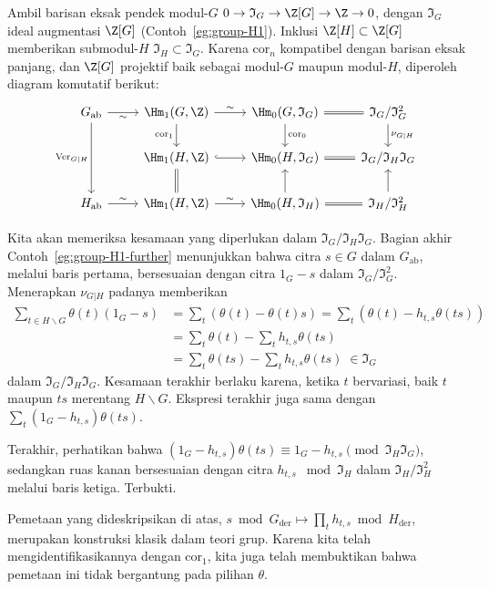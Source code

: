 \begin{bukti}
	Ambil barisan eksak pendek modul-$G$
	$0\to\mathfrak{I}_G\to\Z[G]\to\Z\to0$, dengan $\mathfrak{I}_G$ ideal
	augmentasi $\Z[G]$ (Contoh~\ref{eg:group-H1}). Inklusi
	$\Z[H]\subset\Z[G]$ memberikan submodul-$H$
	$\mathfrak{I}_H\subset\mathfrak{I}_G$. Karena $\mathrm{cor}_n$
	kompatibel dengan barisan eksak panjang, dan $\Z[G]$ projektif baik sebagai
	modul-$G$ maupun modul-$H$, diperoleh diagram komutatif berikut:
	\[\begin{tikzcd}
		G_{\mathrm{ab}} \arrow[r, "\sim"'] \arrow[dd, "{\mathrm{Ver}_{G|H}}"'] &
		\Hm_1(G, \Z) \arrow[d, "{\mathrm{cor}_1}"'] \arrow[r, "\sim"] & \Hm_0(G, \mathfrak{I}_G) \arrow[d, "{\mathrm{cor}_0}"] \arrow[equal, r] &  \mathfrak{I}_G/\mathfrak{I}_G^2 \arrow[d, "{\nu_{G|H}}"] \\
		& \Hm_1(H, \Z) \arrow[equal, d] \arrow[hookrightarrow, r] & \Hm_0(H, \mathfrak{I}_G) \arrow[equal, r] & \mathfrak{I}_G / \mathfrak{I}_H \mathfrak{I}_G \\
		H_{\mathrm{ab}} \arrow[r, "\sim"] & \Hm_1(H, \Z) \arrow[r, "\sim"] & \Hm_0(H, \mathfrak{I}_H) \arrow[equal, r] \arrow[u] & \mathfrak{I}_H / \mathfrak{I}_H^2 \arrow[u]
	\end{tikzcd}\]

	Kita akan memeriksa kesamaan yang diperlukan dalam
	$\mathfrak{I}_G/\mathfrak{I}_H\mathfrak{I}_G$. Bagian akhir
	Contoh~\ref{eg:group-H1-further} menunjukkan bahwa citra $s\in G$ dalam
	$G_{\mathrm{ab}}$, melalui baris pertama, bersesuaian dengan citra
	$1_G-s$ dalam $\mathfrak{I}_G/\mathfrak{I}_G^2$. Menerapkan
	$\nu_{G|H}$ padanya memberikan
	\begin{align*}
		\sum_{t \in H \backslash G} \theta(t)(1_G - s) & = \sum_t (\theta(t) - \theta(t)s) = \sum_t (\theta(t) - h_{t, s}\theta(ts)) \\
		& = \sum_t \theta(t) - \sum_t h_{t, s} \theta(ts) \\
		& = \sum_t \theta(ts) - \sum_t h_{t, s} \theta(ts) \;\in \mathfrak{I}_G
	\end{align*}
	dalam $\mathfrak{I}_G/\mathfrak{I}_H\mathfrak{I}_G$. Kesamaan terakhir
	berlaku karena, ketika $t$ bervariasi, baik $t$ maupun $ts$ merentang
	$H\backslash G$. Ekspresi terakhir juga sama dengan
	$\sum_t(1_G-h_{t,s})\theta(ts)$.
	
	Terakhir, perhatikan bahwa
	$(1_G-h_{t,s})\theta(ts)\equiv1_G-h_{t,s}
	\pmod{\mathfrak{I}_H\mathfrak{I}_G}$, sedangkan ruas kanan bersesuaian dengan
	citra $h_{t,s}\;\bmod\mathfrak{I}_H$ dalam
	$\mathfrak{I}_H/\mathfrak{I}_H^2$ melalui baris ketiga. Terbukti.
\end{bukti}

Pemetaan yang dideskripsikan di atas,
$s\bmod G_{\mathrm{der}}\mapsto\prod_t h_{t,s}\bmod H_{\mathrm{der}}$,
merupakan konstruksi klasik dalam teori grup. Karena kita telah
mengidentifikasikannya dengan $\mathrm{cor}_1$, kita juga telah membuktikan
bahwa pemetaan ini tidak bergantung pada pilihan $\theta$.
